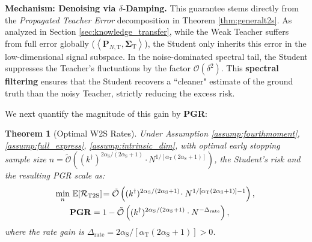\documentclass{article}
\theoremstyle{definition}
\theoremstyle{definition}
\theoremstyle{plain}
\newtheorem{theorem}{Theorem}
\theoremstyle{plain}
\theoremstyle{plain}
\theoremstyle{plain}
\theoremstyle{plain}
\newcommand{\bs}[1]{\boldsymbol{\mathbf{#1}}}
\newcommand{\Ex}{\mathbb{E}}
\newcommand{\te}{\mathrm{T}}
\newcommand{\st}{\mathrm{S}}
\newcommand{\inner}[1]{\left\langle#1\right\rangle}
\begin{document}
\textbf{Mechanism: Denoising via $\delta$-Damping.}
This guarantee stems directly from the \textit{Propagated Teacher Error} decomposition in Theorem \ref{thm:generalt2s}. 
As analyzed in Section \ref{sec:knowledge_transfer}, while the Weak Teacher suffers from full error globally ($\inner{\mathbf{P}_{N,\te}, \mathbf{\Sigma}_\te}$), the Student only inherits this error in the low-dimensional signal subspace.
In the noise-dominated spectral tail, the Student suppresses the Teacher's fluctuations by the factor $\mathcal{O}(\delta^2)$.
This \textbf{spectral filtering} ensures that the Student recovers a  ``cleaner" estimate of the ground truth than the noisy Teacher, strictly reducing the excess risk.


We next quantify the magnitude of this gain by \textbf{PGR}:

\begin{theorem}[Optimal W2S Rates]
\label{thm:w2s_rates}
    Under Assumption \ref{assump:fourthmoment}, \ref{assump:full_express}, \ref{assump:intrinsic_dim}, with optimal early stopping sample size $n = \tilde{\mathcal{O}}\left( (k^\dagger)^{{2\alpha_\st}/{(2\alpha_\st+1)}}\cdot N^{1/[\alpha_\te(2\alpha_\st+1)]} \right)$, the Student's risk and the resulting PGR scale as:
    \begin{align}
        \hspace{-0.1cm}\min_n&\ \Ex[\mathcal{R}_{\mathrm{T2S}}]\! = \tilde{\mathcal{O}}\left((k^\dagger)^{{2\alpha_\st}/({2\alpha_\st+1})}\! \cdot N^{{1}/[{\alpha_\te(2\alpha_\st+1)}]-1} \right),\notag \\
        &\mathbf{PGR} = 1 - \tilde{\mathcal{O}}\left((k^\dagger)^{{2\alpha_\st}/({2\alpha_\st+1})} \cdot N^{-\Delta_{\mathrm{rate}}}\right),
    \end{align}
    where the rate gain is $\Delta_{\mathrm{rate}} = {2\alpha_\st}/[{\alpha_\te(2\alpha_\st+1)}] > 0$.
\end{theorem}
\end{document}

